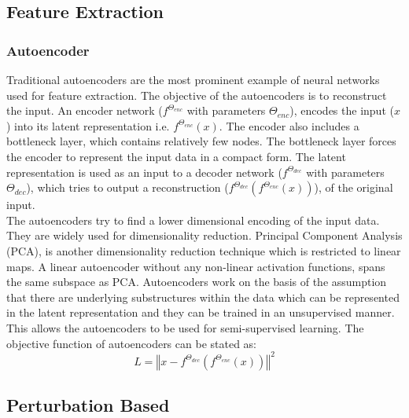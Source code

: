 \subsection{Feature Extraction}
\subsubsection{Autoencoder\cite{kramer1991}}
Traditional autoencoders are the most prominent example of neural networks used for feature extraction. The objective of the autoencoders is to reconstruct the input. An encoder network ($f^{\Theta_{enc}}$ with parameters $\Theta_{enc}$), encodes the input ($x$) into its latent representation i.e. $f^{\Theta_{enc}}(x)$. The encoder also includes a bottleneck layer, which contains relatively few nodes. The bottleneck layer forces the encoder to represent the input data in a compact form. The latent representation is used as an input to a decoder network ($f^{\Theta_{dec}}$ with parameters $\Theta_{dec}$), which tries to output a reconstruction ($f^{\Theta_{dec}}(f^{\Theta_{enc}}(x))$), of the original input. \\
The autoencoders try to find a lower dimensional encoding of the input data. They are widely used for dimensionality reduction. Principal Component Analysis (PCA), is another dimensionality reduction technique which is restricted to linear maps. A linear autoencoder without any non-linear activation functions, spans the same subspace as PCA\cite{baldi1989}. Autoencoders work on the basis of the assumption that there are underlying substructures within the data which can be represented in the latent representation and they can be trained in an unsupervised manner. This allows the autoencoders to be used for semi-supervised learning.
The objective function of autoencoders can be stated as:
\begin{equation}
    \label{equation:autoencoders_loss}
    L = \left\Vert x - f^{\Theta_{dec}}(f^{\Theta_{enc}}(x)) \right\Vert^2
\end{equation}

\subsection{Perturbation Based}
